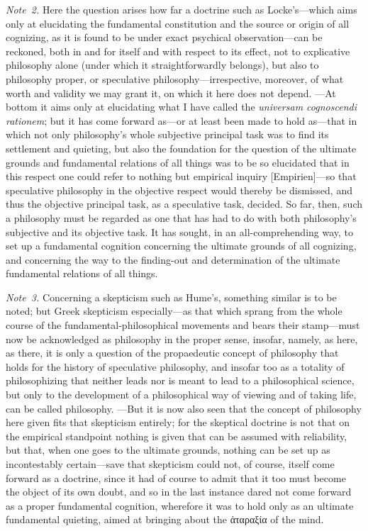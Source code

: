 \documentclass[12pt,a4paper]{book}
\begin{document}
{\small\emph{Note~2.} Here the question arises how far a doctrine such as
Locke's---which aims only at elucidating the fundamental constitution and the
source or origin of all cognizing, as it is found to be under exact psychical
observation---can be reckoned, both in and for itself and with respect to its
effect, not to explicative philosophy alone (under which it straightforwardly
belongs), but also to philosophy proper, or speculative philosophy---irrespective,
moreover, of what worth and validity we may grant it, on which it here does not
depend. ---At bottom it aims only at elucidating what I have called the
\textit{universam cognoscendi rationem}; but it has come forward as---or at least
been made to hold as---that in which not only philosophy's whole subjective
principal task was to find its settlement and quieting, but also the foundation for
the question of the ultimate grounds and fundamental relations of all things was to
be so elucidated that in this respect one could refer to nothing but empirical
inquiry [Empirien]---so that speculative philosophy in the objective respect would
thereby be dismissed, and thus the objective principal task, as a speculative task,
decided. So far, then, such a philosophy must be regarded as one that has had to do
with both philosophy's subjective and its objective task. It has sought, in an
all-comprehending way, to set up a fundamental cognition concerning the ultimate
grounds of all cognizing, and concerning the way to the finding-out and
determination of the ultimate fundamental relations of all things.\par}

{\small\emph{Note~3.} Concerning a skepticism such as Hume's, something similar is
to be noted; but Greek skepticism especially---as that which sprang from the whole
course of the fundamental-philosophical movements and bears their stamp---must now
be acknowledged as philosophy in the proper sense, insofar, namely, as here, as
there, it is only a question of the propaedeutic concept of philosophy that holds
for the history of speculative philosophy, and insofar too as a totality of
philosophizing that neither leads nor is meant to lead to a philosophical science,
but only to the development of a philosophical way of viewing and of taking life,
can be called philosophy. ---But it is now also seen that the concept of philosophy
here given fits that skepticism entirely; for the skeptical doctrine is not that on
the empirical standpoint nothing is given that can be assumed with reliability, but
that, when one goes to the ultimate grounds, nothing can be set up as incontestably
certain---save that skepticism could not, of course, itself come forward as a
doctrine, since it had of course to admit that it too must become the object of its
own doubt, and so in the last instance dared not come forward as a proper
fundamental cognition, wherefore it was to hold only as an ultimate fundamental
quieting, aimed at bringing about the ἀταραξία of the mind.\par}
\end{document}
